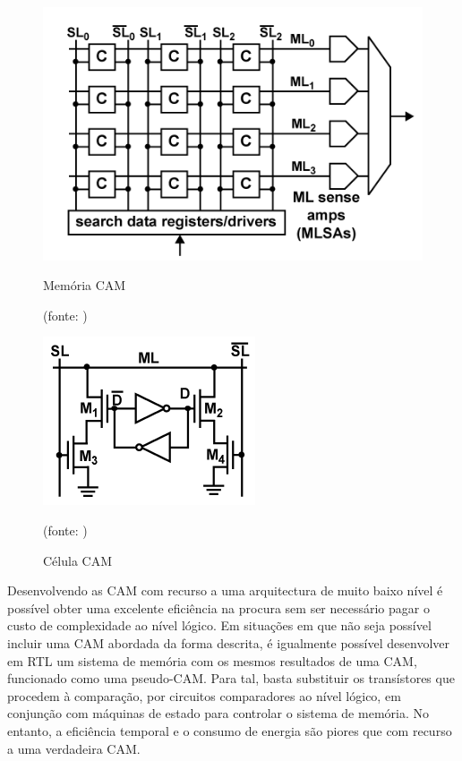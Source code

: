 \begin{figure}[H]
\centering
\begin{minipage}{.5\textwidth}
  \centering
  \includegraphics[width=.9\linewidth]{CAM_TOP.png}
  \caption{Memória CAM}{(fonte: \cite{CAM})}
  \label{fig:test1}
\end{minipage}%
\begin{minipage}{.5\textwidth}
  \centering
  \includegraphics[width=.7\linewidth]{CAM.png}
  \caption{Célula CAM}{(fonte: \cite{CAM})}
  \label{fig:test2}
\end{minipage}
\end{figure}

Desenvolvendo as CAM com recurso a uma arquitectura de muito baixo nível é possível obter uma excelente eficiência na procura sem ser necessário pagar o custo de complexidade ao nível lógico. Em situações em que não seja possível incluir uma CAM abordada da forma descrita, é igualmente possível desenvolver em RTL um sistema de memória com os mesmos resultados de uma CAM, funcionado como uma pseudo-CAM. Para tal, basta substituir os transístores que procedem à comparação, por circuitos comparadores ao nível lógico, em conjunção com máquinas de estado para controlar o sistema de memória. No entanto, a eficiência temporal e o consumo de energia são piores que com recurso a uma verdadeira CAM. \par 

